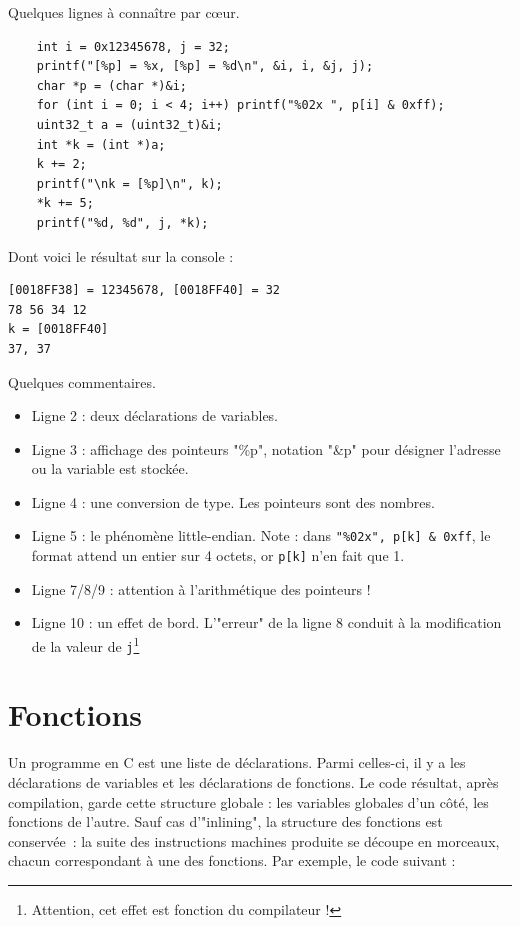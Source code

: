 \documentclass{book}
\newcommand{\code}[1]{\texttt{#1}}
\begin{document}
Quelques lignes à connaître par c\oe ur. 

\begin{verbatim}
    int i = 0x12345678, j = 32;
	printf("[%p] = %x, [%p] = %d\n", &i, i, &j, j);
	char *p = (char *)&i;
	for (int i = 0; i < 4; i++) printf("%02x ", p[i] & 0xff);
	uint32_t a = (uint32_t)&i;
	int *k = (int *)a;
	k += 2;
	printf("\nk = [%p]\n", k);
	*k += 5;
	printf("%d, %d", j, *k);
\end{verbatim}

Dont voici le résultat sur la console : 

\begin{verbatim}
[0018FF38] = 12345678, [0018FF40] = 32
78 56 34 12
k = [0018FF40]
37, 37
\end{verbatim}

Quelques commentaires. 

\begin{itemize}
	\item Ligne 2 : deux déclarations de variables.
	\item Ligne 3 : affichage des pointeurs "\%p", notation "\&p" pour désigner l'adresse ou la variable est stockée. 
	\item Ligne 4 : une conversion de type. Les pointeurs sont des nombres. 
	\item Ligne 5 : le phénomène little-endian. Note : dans \code{"\%02x", p[k] \& 0xff}, le format attend un entier sur 4 octets, or \code{p[k]} n'en fait que 1.
	\item Ligne 7/8/9 : attention à l'arithmétique des pointeurs !
	\item Ligne 10 : un effet de bord. L'"erreur" de la ligne 8 conduit à la modification de la valeur de \code{j}\footnote{Attention, cet effet est fonction du compilateur !}
\end{itemize}

\section{Fonctions}

Un programme en C est une liste de déclarations. Parmi celles-ci, il y a les déclarations de variables et les déclarations de fonctions. Le code résultat, après compilation, garde cette structure globale : les variables globales d'un côté, les fonctions de l'autre. Sauf cas d'"inlining", la structure des fonctions est conservée~: la suite des instructions machines produite se découpe en   morceaux, chacun correspondant à une des fonctions.  Par exemple, le code suivant : 
\end{document}
